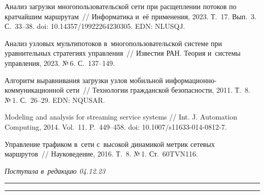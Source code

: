 \begin{multicols}{2}
{{\begin{thebibliography}{9}
 Анализ загрузки  
многопользовательской сети при расщеплении потоков по кратчайшим маршрутам~// 
Информатика и~её применения, 2023. Т.~17. Вып.~3. С.~33--38.
doi: 10.14357/19922264230305. EDN: NLUSQJ.


 Анализ узловых  
мультипотоков в~многопользовательской сис\-те\-ме при уравнительных стратегиях  
управ\-ле\-ния~// Известия РАН. Теория и~сис\-те\-мы управ\-ле\-ния, 2023.  №\,6. С.~137--149.



 Алгоритм 
выравнивания загрузки узлов мобильной ин\-фор\-ма\-ци\-он\-но-ком\-му\-ни\-ка\-ци\-он\-ной сети~//  
Технологии гражданской безопас\-ности, 2011. Т.~8. №\,1. С.~26--29. EDN: NQUSAR.



 Modeling and 
analysis for streaming service systems // Int. J. Automation 
Computing, 2014.  Vol.~11. P.~449--458.    doi: 10.1007/s11633-014-\mbox{0812-7}. 

 Управление трафиком в~сети с~высокой динамикой метрик сетевых маршрутов~// Науковедение, 
2016. Т.~8. №\,1. Ст.~60TVN116.

    \end{thebibliography}

 }
 }

\end{multicols}

\vspace*{-10pt}

\hfill{\small\textit{Поступила в~редакцию 04.12.23}}

\vspace*{4pt}




\hrule

\vspace*{2pt}

\hrule

\vspace*{-6pt}

\def\tit{ANALYSIS OF NODE  MULTIFLOWS IN~A~MULTIUSER NETWORK~SYSTEM\\[-7pt]}


